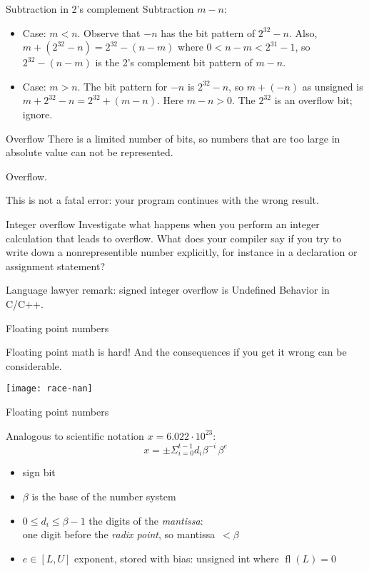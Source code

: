 \begin{numberedframe}{Subtraction in 2's complement}
Subtraction $m-n$:
\begin{itemize}
\item Case: $m<n$. Observe that $-n$ has the bit pattern of $2^{32}-n$.
  Also, $m+(2^{32}-n)=2^{32}-(n-m)$ where $0<n-m<2^{31}-1$,
  so $2^{32}-(n-m)$ is the 2's complement bit pattern of $m-n$.
\item Case: $m>n$.  The bit pattern for $-n$ is $2^{32}-n$, so
  $m+(-n)$ as unsigned is $m+2^{32}-n=2^{32}+(m-n)$. Here
  $m-n>0$. The $2^{32}$ is an overflow bit; ignore.
\end{itemize}
\end{numberedframe}

\begin{numberedframe}{Overflow}
  There is a limited number of bits, so numbers that are too large in
  absolute value can not be represented.

  Overflow.

  This is not a fatal error: your program continues with the wrong result.
\end{numberedframe}

\begin{exercise}{Integer overflow}
  Investigate what happens when you perform an integer calculation
  that leads to overflow. What
  does your compiler say if you try to write down a nonrepresentible
  number explicitly, for instance in a declaration or assignment statement?

  Language lawyer remark: signed integer overflow is Undefined Behavior in C/C++.
\end{exercise}

 {Floating point numbers}

\renewcommand\repr{\mathop{\mathrm{fl}}}

\begin{numberedframe}{Floating point math is hard!}
  And the consequences if you get it wrong can be considerable.
  
  \texttt{[image: race-nan]}
\end{numberedframe}

\begin{numberedframe}{Floating point numbers}

Analogous to scientific notation $x=6.022\cdot 10^{23}$:
\[ x = \pm \Sigma_{i=0}^{t-1} d_i\beta^{-i} \, \beta^e \]
\begin{itemize}
\item sign bit
\item $\beta$ is the base of the number system
\item $0\leq d_i\leq \beta-1$ the digits of the \emph{mantissa}:\\
  one digit before the \emph{radix point}, so mantissa~$<\beta$
\item $e\in [L,U]$ exponent, stored with bias: unsigned int where
  $\repr(L)=0$
\end{itemize}
\end{numberedframe}

